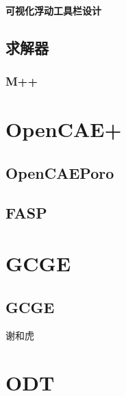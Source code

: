 \documentclass[letterpaper,10pt,english]{sphinxmanual}
\begin{document}
\subsubsection{可视化浮动工具栏设计}
\label{\detokenize{src/airfoil/airfoil_prepost:id7}}
\sphinxstepscope


\section{求解器}
\label{\detokenize{src/airfoil/airfoil_solver:id1}}\label{\detokenize{src/airfoil/airfoil_solver::doc}}

\subsection{M++}
\label{\detokenize{src/airfoil/airfoil_solver:m}}
\sphinxstepscope


\chapter{OpenCAE+}
\label{\detokenize{src/opencaeplus/main:opencae}}\label{\detokenize{src/opencaeplus/main::doc}}

\section{OpenCAEPoro}
\label{\detokenize{src/opencaeplus/main:opencaeporo}}

\section{FASP}
\label{\detokenize{src/opencaeplus/main:fasp}}
\sphinxstepscope


\chapter{GCGE}
\label{\detokenize{src/gcge/main:gcge}}\label{\detokenize{src/gcge/main::doc}}

\section{GCGE}
\label{\detokenize{src/gcge/main:id1}}
\sphinxAtStartPar
谢和虎

\sphinxstepscope


\chapter{ODT}
\label{\detokenize{api/library_root:odt}}\label{\detokenize{api/library_root::doc}}
\end{document}
